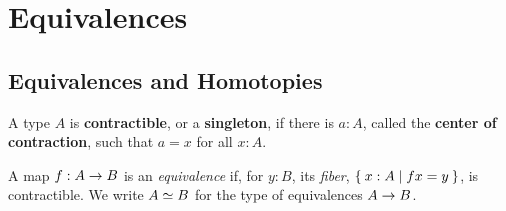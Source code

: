 \newcommand{\com}[3]{\mathtt{swap}_{#1,#2}(#3)}

\chapter{Equivalences}
\label{cha:equivalences}

\section{Equivalences and Homotopies}

\begin{defn}\label{defn:contractible}
  A type $A$ is \textbf{contractible}, or a \textbf{singleton}, if there is $a:A$, called the \textbf{center of contraction}, such that $a=x$ for all $x:A$.
\end{defn}

\begin{defn}\label{defn:equivalence}
  A map $f:A\rightarrow B$ is an {\em equivalence} if, for $y:B$, its {\em fiber}, $\Set{x:A | fx = y}$, is contractible.
  We write $A \simeq B$ for the type of equivalences $A\rightarrow B$.
\end{defn}

